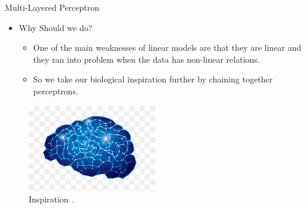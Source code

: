 \begin{frame}{Multi-Layered Perceptron}
    \begin{itemize}
        \item Why Should we do?
        \begin{itemize}
            \item One of the main weaknesses of linear models are that they are linear and they ran into problem when the data has non-linear relations.
            \item So we take our biological inspiration further by chaining together perceptrons.
        \end{itemize}
    \end{itemize}
	\begin{figure}[H]
		\centering
		\includegraphics[width=0.5\textwidth]{Figs/Brain.png}
		\caption{Inspiration \cite{https://www.pngwing.com/en/free-png-xzwgm}.}
	\end{figure}
\end{frame}

